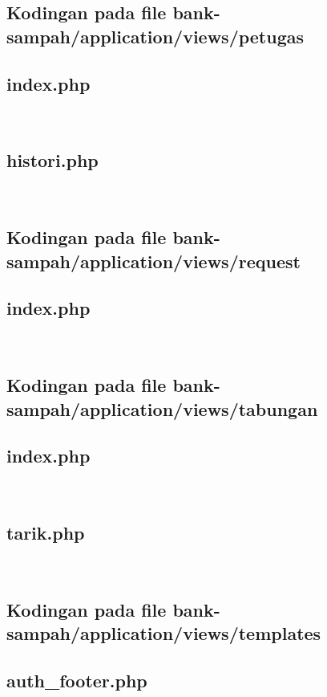 \subsection{Kodingan pada file bank-sampah/application/views/petugas}
\subsection{index.php}
\hfill\\

\subsection{histori.php}
\hfill\\


\subsection{Kodingan pada file bank-sampah/application/views/request}
\subsection{index.php}
\hfill\\


\subsection{Kodingan pada file bank-sampah/application/views/tabungan}
\subsection{index.php}
\hfill\\

\subsection{tarik.php}
\hfill\\


\subsection{Kodingan pada file bank-sampah/application/views/templates}
\subsection{auth\_footer.php}
\hfill\\

